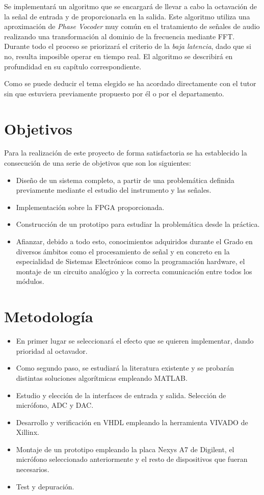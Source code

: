 Se implementará un algoritmo que se encargará de llevar a cabo la octavación de la señal de entrada y de proporcionarla en la salida. Este algoritmo utiliza una aproximación de \emph{Phase Vocoder} muy común en el tratamiento de señales de audio realizando una transformación al dominio de la frecuencia mediante FFT. Durante todo el proceso se priorizará el criterio de la \emph{baja latencia}, dado que si no, resulta imposible operar en tiempo real. El algoritmo se describirá en profundidad en su capítulo correspondiente.

Como se puede deducir el tema elegido se ha acordado directamente con el tutor sin que estuviera previamente propuesto por él o por el departamento.

\section{Objetivos}
Para la realización de este proyecto de forma satisfactoria se ha establecido la consecución de una serie de objetivos que son los siguientes:
\begin{itemize}
\item Diseño de un sistema completo, a partir de una problemática definida previamente mediante el estudio del instrumento y las señales.
\item Implementación sobre la FPGA proporcionada.
\item Construcción de un prototipo para estudiar la problemática desde la práctica.
\item Afianzar, debido a todo esto, conocimientos adquiridos durante el Grado en diversos ámbitos como el procesamiento de señal y en concreto en la especialidad de Sistemas Electrónicos como la programación hardware, el montaje de un circuito analógico y la correcta comunicación entre todos los módulos.
\end{itemize}

\section{Metodología}
\begin{itemize}
\item En primer lugar se seleccionará el efecto que se quieren implementar, dando prioridad al octavador.
\item Como segundo paso, se estudiará la literatura existente y se probarán distintas soluciones algorítmicas empleando MATLAB.
\item Estudio y elección de la interfaces de entrada y salida. Selección de micrófono, ADC y DAC.
\item Desarrollo y verificación en VHDL empleando la herramienta VIVADO de Xillinx.
\item Montaje de un prototipo empleando la placa Nexys A7 de Digilent, el micrófono seleccionado anteriormente y el resto de dispositivos que fueran necesarios.
\item Test y depuración.
\end{itemize}
\newpage
